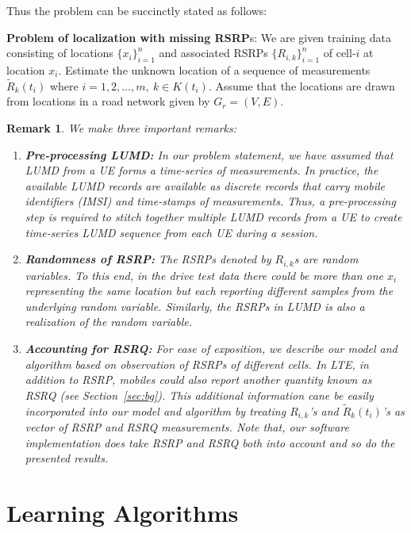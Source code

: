 \documentclass[conference, 10pt]{IEEEtran}
\newtheorem{remark}{Remark}
\begin{document}
Thus the problem can be succinctly stated as follows:

{\bf Problem of localization with missing RSRP}s: We are given training data consisting
of locations $\{x_i\}_{i=1}^n$ and associated RSRPs  $\{R_{i,k}\}_{i=1}^n$ of
cell-$i$ at location $x_i$. Estimate the unknown location of a sequence of measurements
${\tilde{R}}_k(t_i)$ where $i=1,2,\hdots,m,\ k\in K(t_i)$. Assume that the locations
are drawn from locations in a road network given by $G_r=(V,E)$.


\begin{remark}
We make three important remarks:
\begin{enumerate}

\item {\bf Pre-processing LUMD:} In our problem statement, we have assumed that LUMD
from a UE forms a time-series of measurements. In practice, the available LUMD
records are available as discrete records that carry mobile identifiers (IMSI) and
time-stamps of measurements. Thus, a pre-processing step is required to stitch
together multiple LUMD records from a UE to create time-series LUMD sequence from
each UE during a session.

\item {\bf Randomness of RSRP:} The RSRPs denoted by  $R_{i,k}$s are random variables. 
To this end, in the
drive test data there could be more than one $x_i$ representing the same
location but each reporting different samples from the underlying random
variable. Similarly, the RSRPs in LUMD is also a realization
of the random variable.

\item {\bf Accounting for RSRQ:} For ease of exposition, we describe our model and
algorithm based on observation of RSRPs of different cells. In LTE, in
addition to RSRP, mobiles could also report another quantity known as RSRQ
(see Section~\ref{sec:bg}). This additional information cane be easily
incorporated into our model and algorithm by treating $R_{i,k}$'s and
${\tilde{R}}_k(t_i)$'s as vector of RSRP and RSRQ measurements. Note that,
our software implementation does take RSRP and RSRQ both into account and so
do the presented results.

\end{enumerate}

\end{remark}


\section{Learning Algorithms}
\label{sec:localalgo}
\end{document}
